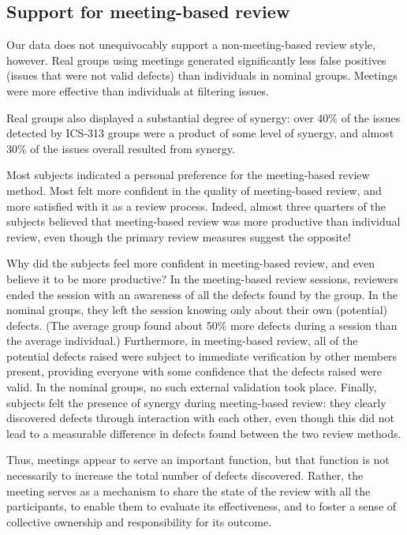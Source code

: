 \subsection{Support for meeting-based review}

Our data does not unequivocably support a non-meeting-based review style,
however. Real groups using meetings generated significantly less
false positives (issues that were not valid defects) than individuals
in nominal groups. Meetings were more effective than individuals at
filtering issues. 

Real groups also displayed a substantial degree of synergy: over 40\% 
of the issues detected by ICS-313 groups were a product of some level
of synergy, and almost 30\% of the issues overall resulted from synergy. 

Most subjects indicated a personal preference for the
meeting-based review method. Most felt more confident in the quality of
meeting-based review, and more satisfied with it as a review process.
Indeed, almost three quarters of the subjects believed that meeting-based
review was more productive than individual review, even though the primary
review measures suggest the opposite!

Why did the subjects feel more confident in meeting-based review, and even
believe it to be more productive?  In the meeting-based review sessions,
reviewers ended the session with an awareness of all the defects found by
the group.  In the nominal groups, they left the session knowing only about
their own (potential) defects. (The average group found about 50\% more
defects during a session than the average individual.)  Furthermore, in
meeting-based review, all of the potential defects raised were subject to
immediate verification by other members present, providing everyone with
some confidence that the defects raised were valid. In the nominal groups,
no such external validation took place.  Finally, subjects felt the
presence of synergy during meeting-based review: they clearly discovered
defects through interaction with each other, even though this did not lead
to a measurable difference in defects found between the two review methods.

Thus, meetings appear to serve an important function, but that function is
not necessarily to increase the total number of defects discovered.
Rather, the meeting serves as a mechanism to share the state of the review
with all the participants, to enable them to evaluate its effectiveness,
and to foster a sense of collective ownership and responsibility for its
outcome.

